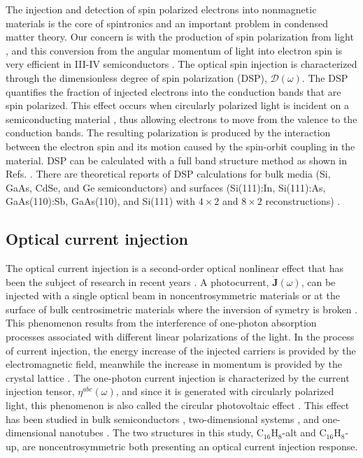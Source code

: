 \documentclass[pss]{wiley2sp} %
\begin{document}
The injection and detection of spin polarized electrons into nonmagnetic
materials is the core of spintronics \cite{vzuticRMP04,fertRMP08} and an
important problem in condensed matter theory. Our concern is with the
production of spin polarization from light \cite{LampelPRL68}, and this
conversion from the angular momentum of light into electron spin is very
efficient in III-IV semiconductors \cite{dyakonovOO84}. The optical spin
injection is characterized through the dimensionless degree of spin polarization (DSP),
$\boldsymbol{\mathcal{D}}(\omega)$. The DSP quantifies the fraction of injected
electrons into the conduction bands that are spin polarized. This effect
occurs when circularly polarized light is incident on a semiconducting
material \cite{dyakonovOO84}, thus allowing electrons to move from the valence
to the conduction bands. The resulting polarization is produced by the
interaction between the electron spin and its motion caused by the spin-orbit
coupling in the material. DSP can be calculated with a full band structure
method as shown in Refs. \cite{nastosPRB07,cabellosPRB09}. There are theoretical reports of DSP
calculations for bulk media (Si, GaAs, CdSe, and Ge semiconductors)
\cite{nastosPRB07,cabellosPRB09} and surfaces (Si(111):In, Si(111):As,
GaAs(110):Sb, GaAs(110), and Si(111) with $4\times2$ and $8\times2$
reconstructions) \cite{mendozaPRB12,arzatePRB14}.


\subsection{Optical current injection}

The optical current injection is a second-order optical nonlinear effect that has been the subject of research in recent years \cite{arzatePRB14,bhatPRB05,fraserPRL99,hachePRL97,lamanAPL99}. A photocurrent, $\mathbf{\dot{J}}(\omega)$, can be injected with a single optical beam in noncentrosymmetric materials or at the surface of bulk centrosimetric materials where the inversion of symetry is broken \cite{arzatePRB14}. This phenomenon results from the interference of one-photon absorption processes associated with different linear polarizations of the light. In the process of current injection, the energy increase of the injected carriers is provided by the electromagnetic field, meanwhile the increase in momentum is provided by the crystal lattice \cite{arzatePRB14}. The one-photon current injection is characterized by the current injection tensor, $\eta^{abc}(\omega)$, and since it is generated with circularly polarized light, this phenomenon is also called the circular photovoltaic effect \cite{sturmanCRCP92}.
This effect has been studied in bulk semiconductors
\cite{hachePRL97,sipePRB00}, two-dimensional systems
\cite{melePRB00,cabellosPRB11}, and one-dimensional nanotubes
\cite{melePRB00}. The two structures in this study,
C$_{16}$H$_{8}$-alt and C$_{16}$H$_{8}$-up, are noncentrosymmetric both presenting an optical current injection response.
\end{document}

